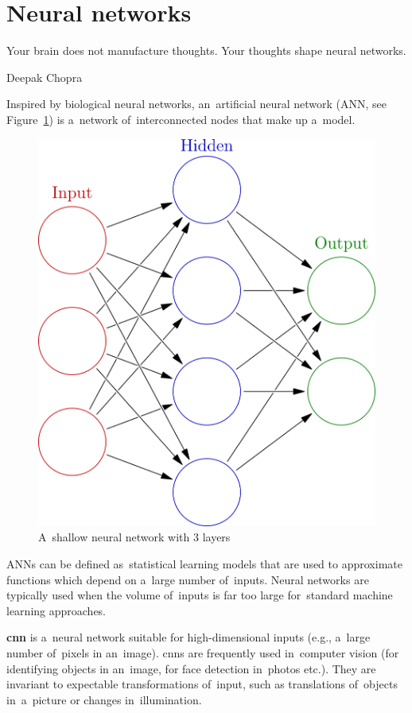 \section{Neural networks}
\epigraph{
  Your brain does not manufacture thoughts.
  Your thoughts shape neural networks.
}{Deepak Chopra}
Inspired by biological neural networks, an~artificial neural network (ANN, see Figure~\ref{fig:shallow-neural-network}) is a~network of~interconnected nodes that make up a~model.
\begin{figure}[H]
  \centering
  \includegraphics[height=.2\textheight]{../img/colored_neural_network.png}
  \caption{A~shallow neural network with 3 layers}
  \label{fig:shallow-neural-network}
\end{figure}
ANNs can be defined as~statistical learning models that are used to approximate functions which depend on a~large number of~inputs.
Neural networks are typically used when the volume of~inputs is far too large for~standard machine learning approaches.

\textbf{\acrfull{cnn}} is a~neural network suitable for high-dimensional inputs (e.g., a~large number of~pixels in an~image).
\acrshort{cnn}s are frequently used in~computer vision (for identifying objects in an~image, for face detection in~photos etc.).
They are invariant to expectable transformations of~input, such as translations of~objects in~a~picture or changes in~illumination.

